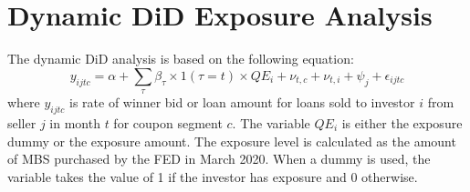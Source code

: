 \documentclass[11pt,a4paper]{article}
\begin{document}

\pagebreak

\section{Dynamic DiD Exposure Analysis}

The dynamic DiD analysis is based on the following equation:
$$y_{ijtc} = \alpha + \sum_\tau \beta_\tau \times 1({\tau}=t)  \times QE_{i} + \nu_{t,c} + \nu_{t,i} +\psi_{j} + \epsilon_{ijtc}$$
where $y_{ijtc}$ is rate of winner bid or loan amount for loans sold to investor $i$ from seller $j$ in month $t$ for coupon segment $c$. The variable $QE_{i}$ is either the exposure dummy or the exposure amount. The exposure level is calculated as the amount of MBS purchased by the FED in March 2020. When a dummy is used, the variable takes the value of 1 if the investor has exposure and 0 otherwise. 
\end{document}
